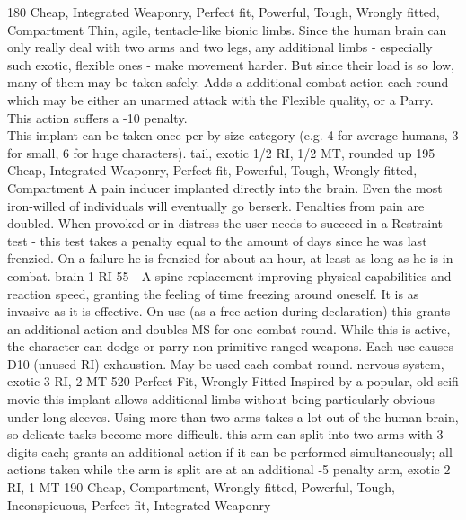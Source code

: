\documentclass[12pt,a4paper,openany,usenames,dvipsnames]{book}
\begin{document}
        {180}
        {Cheap, Integrated Weaponry, Perfect fit, Powerful, Tough, Wrongly fitted, Compartment}
	    {Thin, agile, tentacle-like bionic limbs.
	    	Since the human brain can only really deal with two arms and two legs, any additional limbs
	    		- especially such exotic, flexible ones - make movement harder.
    		But since their load is so low, many of them may be taken safely.}
    	{Adds a additional combat action each round
    		- which may be either an unarmed attack with the Flexible quality,
    		or a Parry.
    		This action suffers a -10 penalty.
    		\\%
    	This implant can be taken once per by size category (e.g. 4 for average humans, 3 for small, 6 for huge characters).}
    	{tail, exotic}
    	{1/2 RI, 1/2 MT, rounded up}
    	{195}
    	{Cheap, Integrated Weaponry, Perfect fit, Powerful, Tough, Wrongly fitted, Compartment}
    	{A pain inducer implanted directly into the brain.
    		Even the most iron-willed of individuals will eventually go berserk.}
    	{Penalties from pain are doubled.
    		When provoked or in distress the user needs to succeed in a Restraint test
    		- this test takes a penalty equal to the amount of days since he was last frenzied.
    		On a failure he is frenzied for about an hour, at least as long as he is in combat.}
    	{brain}
    	{1 RI}
    	{55}
    	{-}
    	{A spine replacement improving physical capabilities and reaction speed,
    		granting the feeling of time freezing around oneself.
    		It is as invasive as it is effective.}
    	{On use (as a free action during declaration) this grants an additional action and doubles MS for one combat round.
    		While this is active, the character can dodge or parry non-primitive ranged weapons.
    		Each use causes D10-(unused RI) exhaustion.
    		May be used each combat round.}
    	{nervous system, exotic}
    	{3 RI, 2 MT}
    	{520}
    	{Perfect Fit, Wrongly Fitted}
        {Inspired by a popular, old scifi movie this implant allows additional limbs without being particularly obvious under long sleeves. Using more than two arms takes a lot out of the human brain, so delicate tasks become more difficult.}
        {this arm can split into two arms with 3 digits each; grants an additional action if it can be performed simultaneously; all actions taken while the arm is split are at an additional -5 penalty}
        {arm, exotic}
        {2 RI, 1 MT}
        {190}
        {Cheap, Compartment, Wrongly fitted, Powerful, Tough, Inconspicuous, Perfect fit, Integrated Weaponry}
\end{document}
